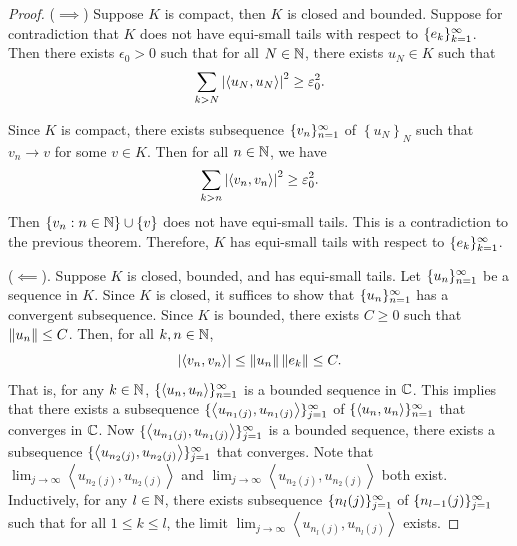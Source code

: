 \documentclass[a4paper]{article}
\renewcommand{\braket}[2]{\left\langle #1, #1 \right\rangle}
\begin{document}
\begin{proof}
  ($\implies$) Suppose $K$ is compact, then $K$ is closed and
  bounded. Suppose for contradiction that $K$ does not have
  equi-small tails with respect to $\{ e_k \}_{k=1}^\infty$. Then
  there exists $\epsilon_0 > 0$ such that for all
  $N \in \mathbb{N}$, there exists $u_N \in K$ such that
  \[
    \sum_{k > N} \abs{\braket{u_N}{e_k}}^2 \geq \epsilon_0^2.
  \]

  Since $K$ is compact, there exists subsequence $\{ v_n \}_{n=1}^\infty$
  of $\left\{ u_N \right\}_N$ such that $v_n \to v$ for some
  $v \in K$. Then for all $n \in \mathbb{N}$, we have
  \[
    \sum_{k > n} \abs{\braket{v_n}{e_k}}^2 \geq \epsilon_0^2.
  \]
  Then $\left\{ v_n : n \in \mathbb{N} \right\} \cup \left\{ v \right\}$
  does not have equi-small tails. This is a contradiction to the previous
  theorem. Therefore, $K$ has equi-small tails with respect
  to $\{ e_k \}_{k=1}^\infty$.

  ($\impliedby$). Suppose $K$ is closed, bounded, and has equi-small
  tails. Let $\{ u_n \}_{n=1}^\infty$ be a sequence in $K$. Since $K$
  is closed, it suffices to show that $\{ u_n \}_{n=1}^\infty$ has a
  convergent subsequence. Since $K$ is bounded,
  there exists $C \geq 0$ such that $\left\lVert u_n\right\rVert \leq C$.
  Then, for all $k, n \in \mathbb{N}$,
  \[
    \abs{\braket{v_n}{e_k}} \leq \norm{u_n} \norm{e_k} \leq C.
  \]
  That is, for any $k \in \mathbb{N}$, $\seqinfn{\braket{u_n}{e_k}}$
  is a bounded sequence in $\mathbb{C}$. This implies that
  there exists a subsequence $\seqinfj{\braket{u_{n_1(j)}}{e_1}}$
  of $\seqinfn{\braket{u_n}{e_1}}$ that converges in $\mathbb{C}$.
  Now $\seqinfj{\braket{u_{n_1(j)}}{e_2}}$ is a bounded sequence,
  there exists a subsequence $\seqinfj{\braket{u_{n_2(j)}}{e_2}}$
  that converges. Note that
  $\lim_{j \to \infty} \braket{u_{n_2(j)}}{e_1}$
  and $\lim_{j \to \infty} \braket{u_{n_2(j)}}{e_2}$
  both exist. Inductively, for any $l \in \mathbb{N}$, there
  exists subsequence $\{ n_l(j) \}_{j=1}^\infty$ of $\{ n_{l-1}(j) \}_{j=1}^\infty$
  such that for all $1 \leq k \leq l$, the limit
  $\lim_{j \to \infty} \braket{u_{n_l(j)}}{e_k}$ exists.


\end{proof}
\end{document}
